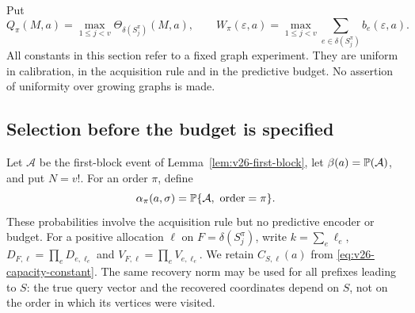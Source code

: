 Put
\[
 Q_\pi(M,a)=\max_{1\le j<v}\Theta_{\delta(S_j^\pi)}(M,a),\qquad
 W_\pi(\varepsilon,a)=\max_{1\le j<v}
                  \sum_{e\in\delta(S_j^\pi)}b_e(\varepsilon,a).
\]
All constants in this section refer to a fixed graph experiment. They are uniform in calibration, in the acquisition rule and in the predictive budget. No assertion of uniformity over growing graphs is made.

\subsection{Selection before the budget is specified}
Let $\mathcal A$ be the first-block event of Lemma~\ref{lem:v26-first-block}, let $\beta(a)=\mathbb P(\mathcal A)$, and put $N=v!$. For an order $\pi$, define
\[
       \alpha_\pi(a,\sigma)=\mathbb P\{\mathcal A,\ \mathrm{order}=\pi\}.
\]
These probabilities involve the acquisition rule but no predictive encoder or budget. For a positive allocation $\ell$ on $F=\delta(S_j^\pi)$, write $k=\sum_e\ell_e$, $D_{F,\ell}=\prod_eD_{e,\ell_e}$ and $V_{F,\ell}=\prod_eV_{e,\ell_e}$. We retain $C_{S,\ell}(a)$ from \eqref{eq:v26-capacity-constant}. The same recovery norm may be used for all prefixes leading to $S$: the true query vector and the recovered coordinates depend on $S$, not on the order in which its vertices were visited.

